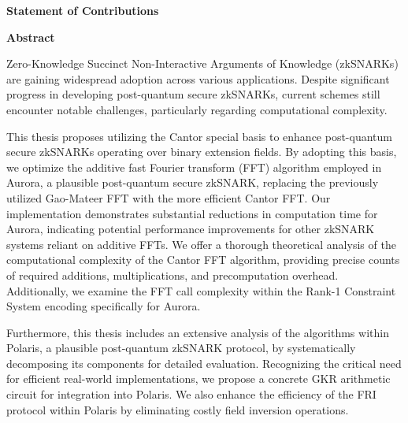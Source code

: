 \cleardoublepage
{}    %

\begin{center}\textbf{Statement of Contributions}\end{center}

\cleardoublepage
{}    %
\begin{center}\textbf{Abstract}\end{center}

Zero-Knowledge Succinct Non-Interactive Arguments of Knowledge (zkSNARKs) are gaining widespread adoption across various applications. Despite significant progress in developing post-quantum secure zkSNARKs, current schemes still encounter notable challenges, particularly regarding computational complexity.

This thesis proposes utilizing the Cantor special basis to enhance post-quantum secure zkSNARKs operating over binary extension fields. By adopting this basis, we optimize the additive fast Fourier transform (FFT) algorithm employed in Aurora, a plausible post-quantum secure zkSNARK, replacing the previously utilized Gao-Mateer FFT with the more efficient Cantor FFT. Our implementation demonstrates substantial reductions in computation time for Aurora, indicating potential performance improvements for other zkSNARK systems reliant on additive FFTs. We offer a thorough theoretical analysis of the computational complexity of the Cantor FFT algorithm, providing precise counts of required additions, multiplications, and precomputation overhead. Additionally, we examine the FFT call complexity within the Rank-1 Constraint System encoding specifically for Aurora.

Furthermore, this thesis includes an extensive analysis of the algorithms within Polaris, a plausible post-quantum zkSNARK protocol, by systematically decomposing its components for detailed evaluation. Recognizing the critical need for efficient real-world implementations, we propose a concrete GKR arithmetic circuit for integration into Polaris. We also enhance the efficiency of the FRI protocol within Polaris by eliminating costly field inversion operations.


